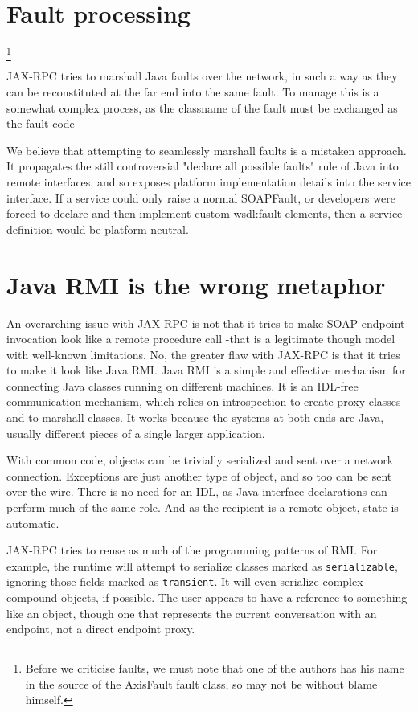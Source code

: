 \documentclass[draft]{paper}
\begin{document}
\section{Fault processing}

\footnote{Before we criticise faults, we must note that one of the authors has his name
in the source of the AxisFault fault class, so may not be without blame
himself.}

JAX-RPC tries to marshall Java faults over the network, in such a way as they
can be reconstituted at the far end into the same fault. To manage this is a
somewhat complex process, as the classname of the fault must be exchanged as the
fault code

We believe that attempting to seamlessly marshall faults is a mistaken approach.
It propagates the still controversial "declare all possible faults" rule of Java
into remote interfaces, and so exposes platform implementation details into the
service interface. If a service could only raise a normal SOAPFault, or
developers were forced to declare and then implement custom wsdl:fault elements,
then a service definition would be platform-neutral. 


\section{Java RMI is the wrong metaphor}

An overarching issue with JAX-RPC is not that it tries to make SOAP
endpoint invocation look like a remote procedure call -that is a legitimate
though model with well-known limitations.  No, the greater flaw with JAX-RPC is
that it tries to make it look like Java RMI. Java RMI is a simple and effective
mechanism for connecting Java classes running on different machines. It is an
IDL-free communication mechanism, which relies on introspection to create proxy
classes and to marshall classes. It works because the systems at both ends are
Java, usually different pieces of a single larger application. 

With common code, objects can be trivially serialized and sent over a network
connection. Exceptions are just another type of object, and so too can be sent
over the wire. There is no need for an IDL, as Java interface declarations can
perform much of the same role. And as the recipient is a remote object, state is
automatic. 


JAX-RPC tries to reuse as much of the programming patterns of RMI. For example,
the runtime will attempt to serialize classes marked as \verb|serializable|,
ignoring those fields marked as \verb|transient|. It will even serialize complex
compound objects, if possible. The user appears to have a reference to something
like an object, though one that represents the current conversation with an endpoint,
not a direct endpoint proxy. 
\end{document}
